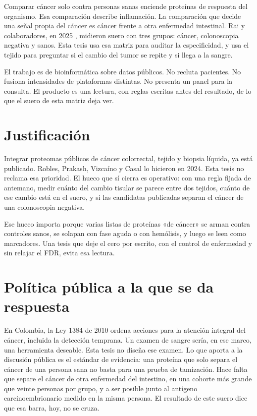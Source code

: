 \documentclass[12pt,oneside]{report}
\begin{document}
Comparar cáncer solo contra personas sanas enciende proteínas de respuesta del organismo. Esa comparación describe inflamación. La comparación que decide una señal propia del cáncer es cáncer frente a otra enfermedad intestinal. Rai y colaboradores, en 2025 \cite{rai2025}, midieron suero con tres grupos: cáncer, colonoscopia negativa y sanos. Esta tesis usa esa matriz para auditar la especificidad, y usa el tejido para preguntar si el cambio del tumor se repite y si llega a la sangre.

El trabajo es de bioinformática sobre datos públicos. No recluta pacientes. No fusiona intensidades de plataformas distintas. No presenta un panel para la consulta. El producto es una lectura, con reglas escritas antes del resultado, de lo que el suero de esta matriz deja ver.

\section{Justificación}
Integrar proteomas públicos de cáncer colorrectal, tejido y biopsia líquida, ya está publicado. Robles, Prakash, Vizcaíno y Casal \cite{robles2024} lo hicieron en 2024. Esta tesis no reclama esa prioridad. El hueco que sí cierra es operativo: con una regla fijada de antemano, medir cuánto del cambio tisular se parece entre dos tejidos, cuánto de ese cambio está en el suero, y si las candidatas publicadas separan el cáncer de una colonoscopia negativa.

Ese hueco importa porque varias listas de proteínas «de cáncer» se arman contra controles sanos, se solapan con fase aguda o con hemólisis, y luego se leen como marcadores. Una tesis que deje el cero por escrito, con el control de enfermedad y sin relajar el FDR, evita esa lectura.

\section{Política pública a la que se da respuesta}
En Colombia, la Ley 1384 de 2010 \cite{ley1384} ordena acciones para la atención integral del cáncer, incluida la detección temprana. Un examen de sangre sería, en ese marco, una herramienta deseable. Esta tesis no diseña ese examen. Lo que aporta a la discusión pública es el estándar de evidencia: una proteína que solo separa el cáncer de una persona sana no basta para una prueba de tamización. Hace falta que separe el cáncer de otra enfermedad del intestino, en una cohorte más grande que veinte personas por grupo, y a ser posible junto al antígeno carcinoembrionario medido en la misma persona. El resultado de este suero dice que esa barra, hoy, no se cruza.
\end{document}
